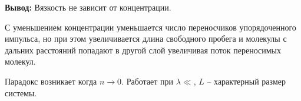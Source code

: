 \textbf{Вывод:} Вязкость не зависит от концентрации.

С уменьшением концентрации уменьшается число переносчиков упорядоченного импульса, но при этом увеличивается длина свободного пробега и молекулы с дальних расстояний попадают в другой слой увеличивая поток переносимых молекул.

Парадокс возникает когда $n \to 0$. Работает при $\lambda \ll$, $L$ -- характерный размер системы.